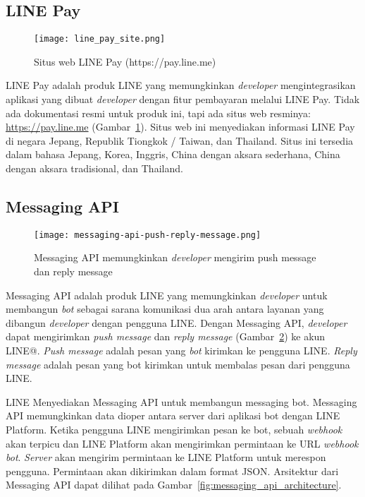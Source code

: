 \subsection{LINE Pay}
\begin{figure}[H]
	\centering  
	\texttt{[image: line\_pay\_site.png]}  
	\caption[Situs web LINE Pay]{Situs web LINE Pay (https://pay.line.me)} 
	\label{fig:line_pay_site} 
\end{figure}

LINE Pay adalah produk LINE yang memungkinkan \textit{developer} mengintegrasikan aplikasi yang dibuat \textit{developer} dengan fitur pembayaran melalui LINE Pay. Tidak ada dokumentasi resmi untuk produk ini, tapi ada situs web resminya: \url{https://pay.line.me} (Gambar~\ref{fig:line_pay_site}). Situs web ini menyediakan informasi LINE Pay di negara Jepang, Republik Tiongkok / Taiwan, dan Thailand. Situs ini tersedia dalam bahasa Jepang, Korea, Inggris, China dengan aksara sederhana, China dengan aksara tradisional, dan Thailand.

\subsection{Messaging API } 
\begin{figure}[H]
	\centering  
	\texttt{[image: messaging-api-push-reply-message.png]}  
	\caption[Push message dan reply message pada Messaging API]{Messaging API memungkinkan \textit{developer} mengirim push message dan reply message} 
	\label{fig:messaging-api-push-reply-message} 
\end{figure}

Messaging API adalah produk LINE yang memungkinkan \textit{developer} untuk membangun \textit{bot} sebagai sarana komunikasi dua arah antara layanan yang dibangun \textit{developer} dengan pengguna LINE. Dengan Messaging API, \textit{developer} dapat mengirimkan \textit{push message} dan \textit{reply message} (Gambar~\ref{fig:messaging-api-push-reply-message}) ke akun LINE@. \textit{Push message} adalah pesan yang \textit{bot} kirimkan ke pengguna LINE. \textit{Reply message} adalah pesan yang bot kirimkan untuk membalas pesan dari pengguna LINE.

LINE Menyediakan Messaging API untuk membangun messaging bot. Messaging API memungkinkan data dioper antara server dari aplikasi bot dengan LINE Platform. Ketika pengguna LINE mengirimkan pesan ke bot, sebuah \textit{webhook} akan terpicu dan LINE Platform akan mengirimkan permintaan ke URL \textit{webhook bot}. \textit{Server} akan mengirim permintaan ke LINE Platform untuk merespon pengguna. Permintaan akan dikirimkan dalam format JSON. Arsitektur dari Messaging API dapat dilihat pada Gambar~\ref{fig:messaging_api_architecture}.

